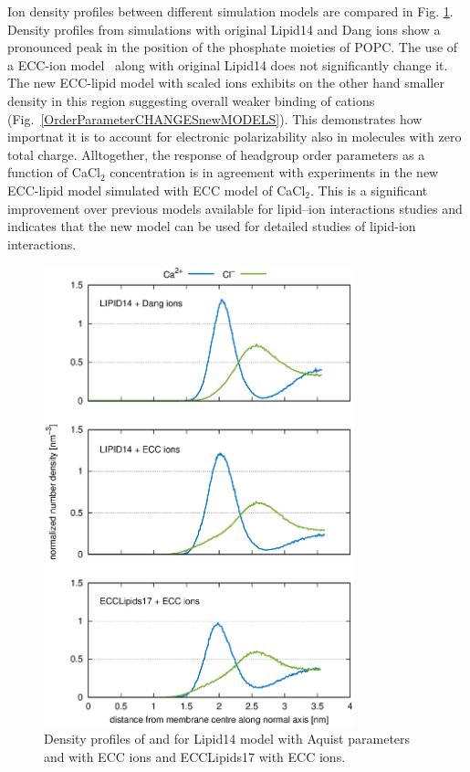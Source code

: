 \documentclass[aip,jcp,twocolumn]{revtex4}
\begin{document}
{Ion density profiles between different simulation models are compared in Fig. \ref{fig:cacl-dens}.
Density profiles from simulations with original Lipid14 and Dang ions \cite{smith94,chang1999,dang2006} 
show a pronounced peak in the position of the phosphate moieties of POPC. 
The use of a ECC-ion model~\cite{kohagen14,kohagen16} along with original Lipid14 does not significantly change it. 
The new ECC-lipid model with scaled ions exhibits on the other hand smaller density in this region 
suggesting overall weaker binding of cations (Fig.~\ref{OrderParameterCHANGESnewMODELS}). 
This demonstrates how importnat it is to account for electronic polarizability also in molecules with zero total charge. 
Alltogether,
the response of headgroup order parameters as a function of CaCl$_2$ concentration is in agreement with
experiments in the new ECC-lipid model simulated with ECC model of CaCl$_2$. 
This is a significant improvement
over previous models available for lipid--ion interactions studies \cite{catte16} and indicates that
the new model can be used for detailed studies of lipid-ion interactions.

\begin{figure}[]
  \centering
  \includegraphics[width=9.0cm,angle=0]{../Fig/CAdensities.eps}
  \caption{\label{fig:cacl-dens}
    Density profiles of  and  for Lipid14 model with Aquist parameters and with ECC ions and ECCLipids17 with ECC ions. }
\end{figure}


}
\end{document}

